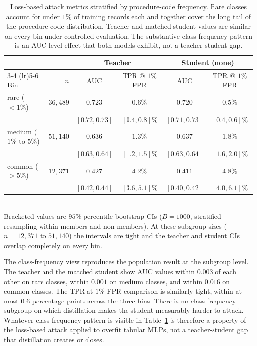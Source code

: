 \documentclass[conference]{IEEEtran}
\begin{document}
\begin{table}[t]
\caption{Loss-based attack metrics stratified by procedure-code frequency. Rare classes account for under $1\%$ of training records each and together cover the long tail of the procedure-code distribution. Teacher and matched student values are similar on every bin under controlled evaluation. The substantive class-frequency pattern is an AUC-level effect that both models exhibit, not a teacher-student gap.}
\label{tab:freq}
\centering
\footnotesize
\setlength{\tabcolsep}{10pt}
\begin{tabular}{lrcccc}
\toprule
& & \multicolumn{2}{c}{Teacher} & \multicolumn{2}{c}{Student (none)} \\
\cmidrule(lr){3-4} \cmidrule(lr){5-6}
Bin & $n$ & AUC & TPR @ $1\%$ FPR & AUC & TPR @ $1\%$ FPR \\
\midrule
rare ($<1\%$)        & $36{,}489$ & $0.723$ & $0.6\%$ & $0.720$ & $0.5\%$ \\
                     &            & {\scriptsize $[0.72, 0.73]$} & {\scriptsize $[0.4, 0.8]\%$} & {\scriptsize $[0.71, 0.73]$} & {\scriptsize $[0.4, 0.6]\%$} \\
medium ($1\%$ to $5\%$) & $51{,}140$ & $0.636$ & $1.3\%$ & $0.637$ & $1.8\%$ \\
                     &            & {\scriptsize $[0.63, 0.64]$} & {\scriptsize $[1.2, 1.5]\%$} & {\scriptsize $[0.63, 0.64]$} & {\scriptsize $[1.6, 2.0]\%$} \\
common ($>5\%$)      & $12{,}371$ & $0.427$ & $4.2\%$ & $0.411$ & $4.8\%$ \\
                     &            & {\scriptsize $[0.42, 0.44]$} & {\scriptsize $[3.6, 5.1]\%$} & {\scriptsize $[0.40, 0.42]$} & {\scriptsize $[4.0, 6.1]\%$} \\
\bottomrule
\end{tabular}
\\[2pt]
{\footnotesize Bracketed values are $95\%$ percentile bootstrap CIs ($B = 1000$, stratified resampling within members and non-members). At these subgroup sizes ($n = 12{,}371$ to $51{,}140$) the intervals are tight and the teacher and student CIs overlap completely on every bin.}
\end{table}

The class-frequency view reproduces the population result at the subgroup level. The teacher and the matched student show AUC values within $0.003$ of each other on rare classes, within $0.001$ on medium classes, and within $0.016$ on common classes. The TPR at $1\%$ FPR comparison is similarly tight, within at most $0.6$ percentage points across the three bins. There is no class-frequency subgroup on which distillation makes the student measurably harder to attack. Whatever class-frequency pattern is visible in Table~\ref{tab:freq} is therefore a property of the loss-based attack applied to overfit tabular MLPs, not a teacher-student gap that distillation creates or closes.
\end{document}
